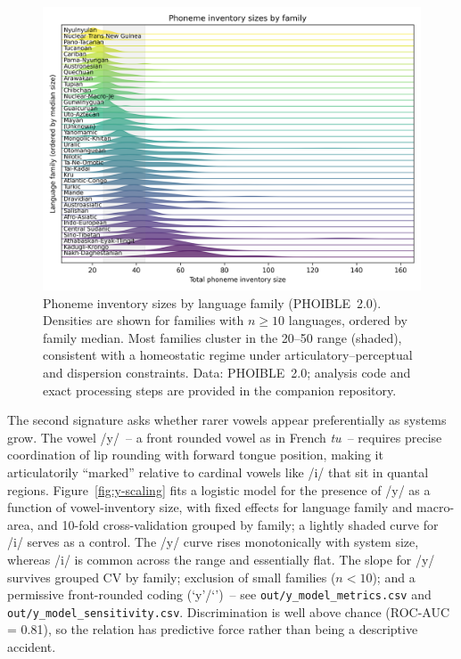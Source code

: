 \documentclass[12pt]{article}
\begin{document}
\begin{figure}[t]
  \centering
  \includegraphics[width=\linewidth]{images/inventory_ridgelines.png}
  \caption{Phoneme inventory sizes by language family (PHOIBLE~2.0).
  Densities are shown for families with $n \ge 10$ languages, ordered by family median.
  Most families cluster in the 20–50 range (shaded), consistent with a homeostatic regime under articulatory–perceptual and dispersion constraints.
  Data: PHOIBLE~2.0; analysis code and exact processing steps are provided in the companion repository.}
  \label{fig:ridgelines}
\end{figure}

The second signature asks whether rarer vowels appear preferentially as systems grow. The vowel /y/~-- a front rounded vowel as in French \textit{tu}~-- requires precise coordination of lip rounding with forward tongue position, making it articulatorily \enquote{marked} relative to cardinal vowels like /i/ that sit in quantal regions. Figure~\ref{fig:y-scaling} fits a logistic model for the presence of /y/ as a function of vowel-inventory size, with fixed effects for language family and macro-area, and 10-fold cross-validation grouped by family; a lightly shaded curve for /i/ serves as a control. The /y/ curve rises monotonically with system size, whereas /i/ is common across the range and essentially flat. The slope for /y/ survives grouped CV by family; exclusion of small families ($n < 10$); and a permissive front-rounded coding (`y'/`\textscy{}')~-- see \texttt{out/y\_model\_metrics.csv} and \texttt{out/y\_model\_sensitivity.csv}. Discrimination is well above chance (ROC-AUC = 0.81), so the relation has predictive force rather than being a descriptive accident.
\end{document}
